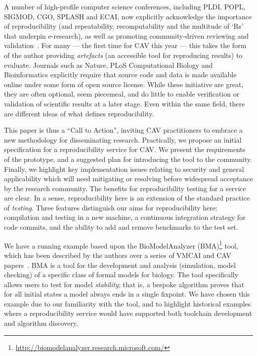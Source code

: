 \documentclass[conference]{IEEEtran}
\begin{document}
A number of high-profile computer science conferences, including PLDI,
POPL, SIGMOD, CGO, SPLASH and ECAI, now explicitly acknowledge the
importance of reproducibility (and repeatability, recomputability and
the multitude of `Rs' that underpin e-research), as well as promoting
community-driven reviewing and validation~\cite{fursin+dubach:2014}.
For many --- the first time for CAV this year --- this takes the form
of the author providing \emph{artefacts} (an accessible tool for
reproducing results) to evaluate. Journals such as Nature, PLoS
Computational Biology and Bioinformatics explicitly require that
source code and data is made available online under some form of open
source license. While these initiative are great, they are often
optional, seem piecemeal, and do little to enable verification or
validation of scientific results at a later stage. Even within the
same field, there are different ideas of what defines reproducibility.

This paper is thus a ``Call to Action'', inviting CAV practitioners to
embrace a new methodology for disseminating research. Practically, we
propose an initial specification for a reproducibility service for CAV. We
present the requirements of the prototype, and a suggested plan for
introducing the tool to the community. Finally, we highlight key
implementation issues relating to security and general applicability
which will need mitigating or resolving before widespread acceptance
by the research community.  The benefits for reproducibility testing
for a service are clear. In a sense, reproducibility here is an
extension of the standard practice of \emph{testing}.  Three features
distinguish our aims for reproducibility here: compilation and testing
in a new machine, a continuous integration strategy for code commits,
and the ability to add and remove benchmarks to the test set.

We have a running example based upon the BioModelAnalyzer
(BMA)\footnote{\url{http://biomodelanalyzer.research.microsoft.com/}}
tool, which has been described by the authors over a series of VMCAI
and CAV
papers~\cite{cook-et-al:2011,benque-et-al:2012,cook-et-al:2014}.
BMA is a tool for the development and analysis (simulation, model
checking) of a specific class of formal models for biology. The tool
specifically allows users to test for model \emph{stability}; that
is, a bespoke algorithm proves that for all initial states a model
always ends in a single fixpoint. We have chosen this example due to
our familiarity with the tool, and to highlight historical examples
where a reproducibility service would have supported both
toolchain development and algorithm discovery.
\end{document}
